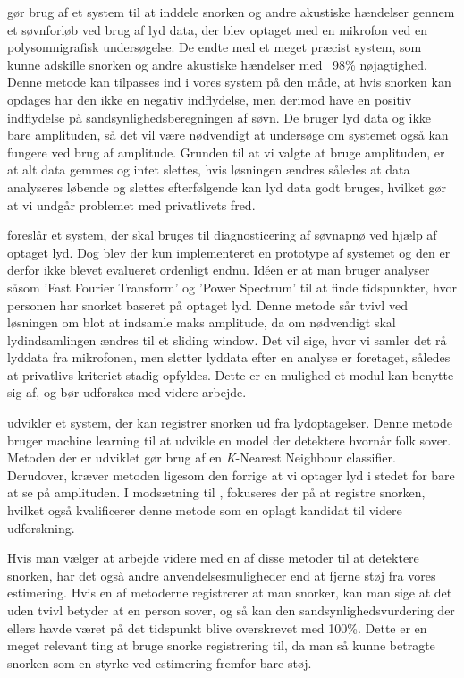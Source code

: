 \citet{Dafna2013} gør brug af et system til at inddele snorken og andre akustiske hændelser gennem et søvnforløb ved brug af lyd data, der blev optaget med en mikrofon ved en polysomnigrafisk undersøgelse. 
De endte med et meget præcist system, som kunne adskille snorken og andre akustiske hændelser med ~98\% nøjagtighed.
Denne metode kan tilpasses ind i vores system på den måde, at hvis snorken kan opdages har den ikke en negativ indflydelse, men derimod have en positiv indflydelse på sandsynlighedsberegningen af søvn. 
De bruger lyd data og ikke bare amplituden, så det vil være nødvendigt at undersøge om systemet også kan fungere ved brug af amplitude.
Grunden til at vi valgte at bruge amplituden, er at alt data gemmes og intet slettes, hvis løsningen ændres således at data analyseres løbende og slettes efterfølgende kan lyd data godt bruges, hvilket gør at vi undgår problemet med privatlivets fred.

\citet{Calabrese20111101} foreslår et system, der skal bruges til diagnosticering af søvnapnø ved hjælp af optaget lyd.
Dog blev der kun implementeret en prototype af systemet og den er derfor ikke blevet evalueret ordenligt endnu. 
Idéen er at man bruger analyser såsom 'Fast Fourier Transform' og 'Power Spectrum' til at finde tidspunkter, hvor personen har snorket baseret på optaget lyd. 
Denne metode sår tvivl ved løsningen om blot at indsamle maks amplitude, da om nødvendigt skal lydindsamlingen ændres til et sliding window.
Det vil sige, hvor vi samler det rå lyddata fra mikrofonen, men sletter lyddata efter en analyse er foretaget, således at privatlivs kriteriet stadig opfyldes.
Dette er en mulighed et modul kan benytte sig af, og bør udforskes med videre arbejde.

\citet{7051338} udvikler et system, der kan registrer snorken ud fra lydoptagelser.
Denne metode bruger machine learning til at udvikle en model der detektere hvornår folk sover.
Metoden der er udviklet gør brug af en \textit{K}-Nearest Neighbour classifier.
Derudover, kræver metoden ligesom den forrige at vi optager lyd i stedet for bare at se på amplituden.
I modsætning til \citet{Calabrese20111101}, fokuseres der på at registre snorken, hvilket også kvalificerer denne metode som en oplagt kandidat til videre udforskning.

Hvis man vælger at arbejde videre med en af disse metoder til at detektere snorken, har det også andre anvendelsesmuligheder end at fjerne støj fra vores estimering.
Hvis en af metoderne registrerer at man snorker, kan man sige at det uden tvivl betyder at en person sover, og så kan den sandsynlighedsvurdering der ellers havde været på det tidspunkt blive overskrevet med 100\%.
Dette er en meget relevant ting at bruge snorke registrering til, da man så kunne betragte snorken som en styrke ved estimering fremfor bare støj.
